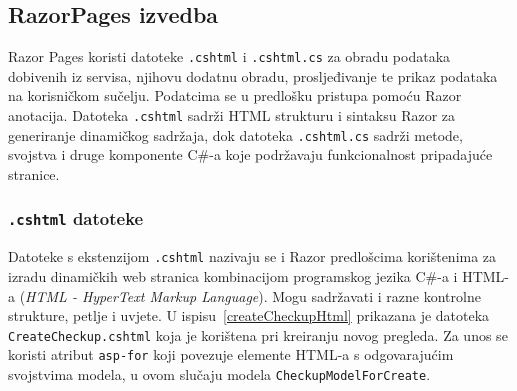 \subsection{RazorPages izvedba}
\label{subsec:izvedbaRP}

Razor Pages koristi datoteke \texttt{.cshtml} i \texttt{.cshtml.cs} za obradu podataka dobivenih iz servisa, njihovu dodatnu obradu, prosljeđivanje te prikaz podataka na korisničkom sučelju. Podatcima se u predlošku pristupa pomoću Razor anotacija. Datoteka \texttt{.cshtml} sadrži HTML strukturu i sintaksu Razor za generiranje dinamičkog sadržaja, dok datoteka \texttt{.cshtml.cs} sadrži metode, svojstva i druge komponente C\#-a koje podržavaju funkcionalnost pripadajuće stranice.
\subsubsection{\texttt{.cshtml} datoteke}
\label{subsubsec:.cshtml}
Datoteke s ekstenzijom \texttt{.cshtml} nazivaju se i Razor predlošcima korištenima za izradu dinamičkih web stranica kombinacijom programskog jezika C\#-a i HTML-a (\textit{HTML - HyperText Markup Language}). Mogu sadržavati i razne kontrolne strukture, petlje i uvjete. U ispisu~\ref{createCheckupHtml} prikazana je datoteka \texttt{CreateCheckup.cshtml} koja je korištena pri kreiranju novog pregleda. Za unos se koristi atribut \texttt{asp-for} koji povezuje elemente HTML-a s odgovarajućim svojstvima modela, u ovom slučaju modela \texttt{CheckupModelForCreate}.

